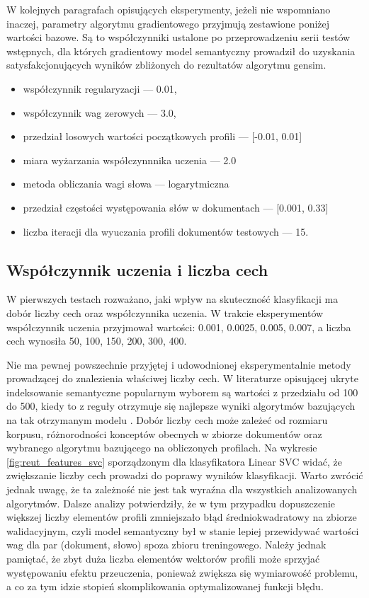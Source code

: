 \documentclass{pracamgr}
\begin{document}
W kolejnych paragrafach opisujących eksperymenty, jeżeli nie wspomniano inaczej, parametry algorytmu gradientowego przyjmują zestawione poniżej wartości bazowe. Są to współczynniki ustalone po przeprowadzeniu serii testów wstępnych, dla których gradientowy model semantyczny prowadził do uzyskania satysfakcjonujących wyników zbliżonych do rezultatów algorytmu gensim.

\begin{itemize}
    \item współczynnik regularyzacji --- 0.01,
    \item współczynnik wag zerowych --- 3.0,
    \item przedział losowych wartości początkowych profili --- [-0.01, 0.01]
    \item miara wyżarzania współczynnnika uczenia --- 2.0
    \item metoda obliczania wagi słowa --- logarytmiczna
    \item przedział częstości występowania słów w dokumentach --- [0.001, 0.33]
    \item liczba iteracji dla wyuczania profili dokumentów testowych --- 15.
\end{itemize}

\subsection{Współczynnik uczenia i liczba cech}

W pierwszych testach rozważano, jaki wpływ na skuteczność klasyfikacji ma dobór liczby cech oraz współczynnika uczenia. W trakcie eksperymentów współczynnik uczenia przyjmował wartości: 0.001, 0.0025, 0.005, 0.007, a liczba cech wynosiła 50, 100, 150, 200, 300, 400.

Nie ma pewnej powszechnie przyjętej i udowodnionej eksperymentalnie metody prowadzącej do znalezienia właściwej liczby cech. W literaturze opisującej ukryte indeksowanie semantyczne popularnym wyborem są wartości z przedziału od 100 do 500, kiedy to z reguły otrzymuje się najlepsze wyniki algorytmów bazujących na tak otrzymanym modelu \cite{landauer}. Dobór liczby cech może zależeć od rozmiaru korpusu, różnorodności konceptów obecnych w zbiorze dokumentów oraz wybranego algorytmu bazującego na obliczonych profilach. Na wykresie \ref{fig:reut_features_svc} sporządzonym dla klasyfikatora Linear SVC widać, że zwiększanie liczby cech prowadzi do poprawy wyników klasyfikacji. Warto zwrócić jednak uwagę, że ta zależność nie jest tak wyraźna dla wszystkich analizowanych algorytmów. Dalsze analizy potwierdziły, że w tym przypadku dopuszczenie większej liczby elementów profili zmniejszało błąd średniokwadratowy na zbiorze walidacyjnym, czyli model semantyczny był w stanie lepiej przewidywać wartości wag dla par (dokument, słowo) spoza zbioru treningowego. Należy jednak pamiętać, że zbyt duża liczba elementów wektorów profili może sprzyjać występowaniu efektu przeuczenia, ponieważ zwiększa się wymiarowość problemu, a co za tym idzie stopień skomplikowania optymalizowanej funkcji błędu.
\end{document}
